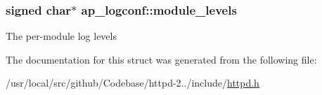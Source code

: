 \subsubsection[{\texorpdfstring{module\+\_\+levels}{module_levels}}]{\setlength{\rightskip}{0pt plus 5cm}signed char$\ast$ ap\+\_\+logconf\+::module\+\_\+levels}\hypertarget{structap__logconf_a8da0bb36661c82630be8d2269593b8f0}{}\label{structap__logconf_a8da0bb36661c82630be8d2269593b8f0}
The per-\/module log levels 

The documentation for this struct was generated from the following file\+:\begin{DoxyCompactItemize}
\item 
/usr/local/src/github/\+Codebase/httpd-\/2../include/\hyperlink{httpd_8h}{httpd.\+h}\end{DoxyCompactItemize}
